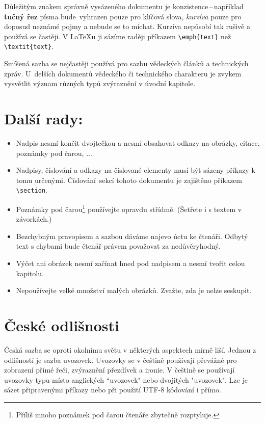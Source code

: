 \documentclass[a4paper, 10pt, twocolumn]{article}
\begin{document}
Důležitým znakem správně vysázeného dokumentu je konzistence\,--\,například {\bf tučný řez} písma bude \,vyhrazen pouze pro klíčová slova, \emph{kurzíva} pouze pro doposud ne\-známé pojmy a nebude se to míchat.
Kurzíva nepůsobí tak rušivě a používá se častěji.
V {\LaTeX}u ji sázíme raději příkazem \verb|\emph{text}| než \verb|\textit{text}|.

Smíšená sazba se nejčastěji používá pro sazbu vědec\-kých článků a technických zpráv.
U~delších dokumentů vědeckého či technického charakteru je zvykem vysvětlit význam různých typů zvýraznění v úvodní kapitole.

\section{Další rady:}
\begin{itemize}
\item Nadpis nesmí končit dvojtečkou a nesmí obsahovat odkazy na obrázky, citace, poznámky pod čarou, ...

\item Nadpisy, číslování a odkazy na číslované elementy musí být sázeny příkazy k tomu určenými.
Číslo\-vání~sekcí tohoto dokumentu je zajištěno příkazem \verb|\section|.

\item Poznámky pod čarou\footnote{Příliš mnoho poznámek pod čarou čtenáře zbytečně rozptyluje.} používejte opravdu střídmě.
(Šetřete i s textem v závorkách.)

\item Bezchybným pravopisem a sazbou dáváme najevo úctu ke čtenáři.
Odbytý text s chybami bude čtenář právem považovat za nedůvěryhodný.

\item Výčet ani obrázek nesmí začínat hned pod nadpisem a nesmí tvořit celou kapitolu.

\item Nepoužívejte velké množství malých obrázků.
Zvažte, zda je nelze seskupit.
\end{itemize}

\section{České odlišnosti}
Česká sazba se oproti okolnímu světu v některých aspektech mírně liší.
Jednou z odlišností je sazba uvozovek.
Uvozovky se v češtině používají převážně pro zobrazení přímé řeči, zvýraznění přezdívek a ironie.
V češtině se používají uvozovky typu  místo anglických ``uvozovek" nebo dvojitých "uvozovek".
Lze je sázet připravenými příkazy nebo při použití UTF-8 kódování i přímo.
\end{document}
